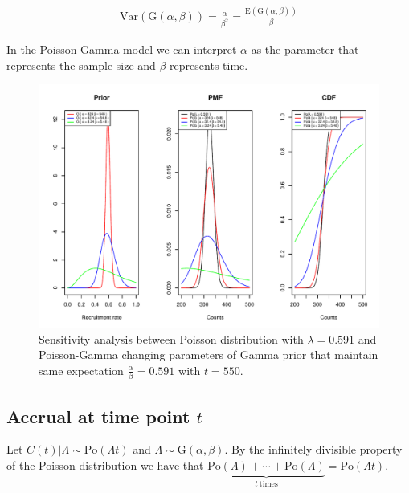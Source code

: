 \begin{align*}
\textrm{Var}(\textrm{G}(\alpha, \beta)) = \frac{\alpha}{\beta^2} =\frac{\textrm{E}(\textrm{G}(\alpha, \beta))}{\beta}
\end{align*}

In the Poisson-Gamma model we can interpret $\alpha$ as the parameter that represents the sample size and $\beta$ represents time.

\begin{figure}
\begin{knitrout}
\color{fgcolor}

{\centering \includegraphics[width=\textwidth-3cm]{figure/ch02_figunnamed-chunk-10-1} 

}


\end{knitrout}
	\caption{Sensitivity analysis between Poisson distribution with $\lambda = 0.591$ and Poisson-Gamma changing parameters of Gamma prior that maintain same expectation $\frac{\alpha}{\beta} = 0.591$ with $t=550$.}
  \label{fig:2_6}
\end{figure}

\subsection{Accrual at time point $t$}
Let $C(t)|\Lambda \sim \textrm{Po}(\Lambda t)$ and $\Lambda \sim \textrm{G}(\alpha,\beta)$. By the infinitely divisible property of the Poisson distribution we have that $\underbrace{\textrm{Po} (\Lambda) +\cdots +\textrm{Po} (\Lambda)}_{t \ \text{times}} = \textrm{Po} (\Lambda t)$. 

